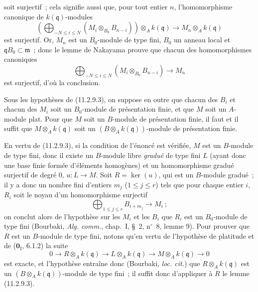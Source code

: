 
soit surjectif~; cela signifie aussi que, pour tout entier $n$,
l'homomorphisme canonique de $k(\mathfrak q)$-modules
\[
\left(\bigoplus_{-N\leq i\leq N}(M_i\otimes_{B_0}B_{n-i})\right)
\otimes_Ak(\mathfrak q)\longrightarrow M_n\otimes_Ak(\mathfrak q)
\]
est surjectif. Or, $M_n$ est un $B_0$-module de type fini, $B_0$ un anneau
local et $\mathfrak qB_0\subset\mathfrak m$~; donc le lemme de Nakayama prouve
que chacun des homomorphismes canoniques
\[
\bigoplus_{-N\leq i\leq N}(M_i\otimes_{B_0}B_{n-i})\longrightarrow M_n
\]
est surjectif, d'où la conclusion.

\begin{corollary}[11.2.9.4]
\label{IV.11.2.9.4-fr}
Sous les hypothèses de (11.2.9.3), on suppose en outre que chacun des $B_i$ et
chacun des $M_i$ soit un $B_0$-module de présentation finie, et que $M$ soit
un $A$-module plat. Pour que $M$ soit un $B$-module de présentation finie, il
faut et il suffit que $M\otimes_Ak(\mathfrak q)$ soit un
$(B\otimes_Ak(\mathfrak q))$-module de présentation finie.
\end{corollary}

En vertu de (11.2.9.3), si la condition de l'énoncé est vérifiée, $M$ est un
$B$-module de type fini, donc il existe un $B$-module libre \emph{gradué} de
type fini $L$ (ayant donc une base finie formée d'éléments homogènes) et un
homomorphisme gradué surjectif de degré 0, $u:L\to M$. Soit $R=\ker(u)$, qui
est un $B$-module gradué~; il y a donc un nombre fini d'entiers $m_j$
($1\leq j\leq r$) tels que pour chaque entier $i$, $R_i$ soit le noyau d'un
homomorphisme surjectif
\[
\bigoplus_{1\leq j\leq r}B_{i+m_j}\longrightarrow M_i~;
\]
on conclut alors de l'hypothèse sur les $M_i$ et les $B_i$ que $R_i$ est un
$B_0$-module de type fini (Bourbaki, \emph{Alg. comm.}, chap.~I, \S~2,
n$^\circ$~8, lemme 9). Pour prouver que $R$ est un $B$-module de type fini,
notons qu'en vertu de l'hypothèse de platitude et de
($\mathbf 0_{\mathrm I}$, 6.1.2) la suite
\[
0\longrightarrow R\otimes_Ak(\mathfrak q)
\longrightarrow L\otimes_Ak(\mathfrak q)
\longrightarrow M\otimes_Ak(\mathfrak q)\longrightarrow0
\]
est exacte, et l'hypothèse entraîne donc (Bourbaki, \emph{loc. cit.}) que
$R\otimes_Ak(\mathfrak q)$ est un $(B\otimes_Ak(\mathfrak q))$-module de type
fini~; il suffit donc d'appliquer à $R$ le lemme (11.2.9.3).

